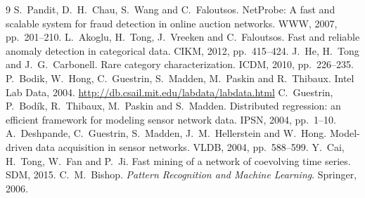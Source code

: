 \documentclass[11pt]{article}
\begin{document}
\begin{thebibliography}{9}\small
{} S.~Pandit, D.~H.~Chau, S.~Wang and C.~Faloutsos. NetProbe: A fast and scalable system for fraud detection in online auction networks. WWW, 2007, pp.~201--210.
 L.~Akoglu, H.~Tong, J.~Vreeken and C.~Faloutsos. Fast and reliable anomaly detection in categorical data. CIKM, 2012, pp.~415--424.
 J.~He, H.~Tong and J.~G.~Carbonell. Rare category characterization. ICDM, 2010, pp.~226--235.
 P.~Bodik, W.~Hong, C.~Guestrin, S.~Madden, M.~Paskin and R.~Thibaux. Intel Lab Data, 2004. \url{http://db.csail.mit.edu/labdata/labdata.html}
 C.~Guestrin, P.~Bod\'ik, R.~Thibaux, M.~Paskin and S.~Madden. Distributed regression: an efficient framework for modeling sensor network data. IPSN, 2004, pp.~1--10.
 A.~Deshpande, C.~Guestrin, S.~Madden, J.~M.~Hellerstein and W.~Hong. Model-driven data acquisition in sensor networks. VLDB, 2004, pp.~588--599.
 Y.~Cai, H.~Tong, W.~Fan and P.~Ji. Fast mining of a network of coevolving time series. SDM, 2015.
 C.~M.~Bishop. \emph{Pattern Recognition and Machine Learning}. Springer, 2006.
\end{thebibliography}
\end{document}
